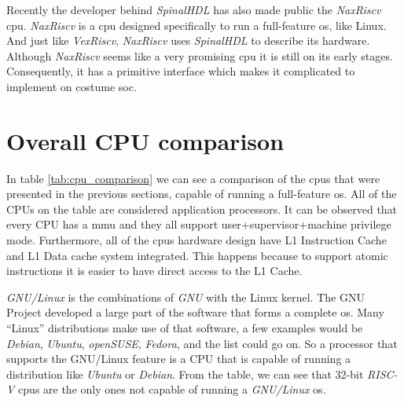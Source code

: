 Recently the developer behind \textit{SpinalHDL} has also made public the \textit{NaxRiscv} \acrshort{cpu}. \textit{NaxRiscv} is a \acrshort{cpu} designed specifically to run a full-feature \acrlong{os}, like Linux. And just like \textit{VexRiscv}, \textit{NaxRiscv} uses \textit{SpinalHDL} to describe its hardware. Although \textit{NaxRiscv} seems like a very promising \acrshort{cpu} it is still on its early stages. Consequently, it has a primitive interface which makes it complicated to implement on costume \acrfull{soc}.


\section{Overall CPU comparison}
\label{section:cpu_comparison}
In table \ref*{tab:cpu_comparison} we can see a comparison of the \acrshort{cpu}s that were presented in the previous sections, capable of running a full-feature \acrfull{os}. All of the CPUs on the table are considered application processors. It can be observed that every CPU has a \acrfull{mmu} and they all support \acrshort{user}+\acrshort{supervisor}+\acrshort{machine} privilege mode. Furthermore, all of the \acrshort{cpu}s hardware design have L1 Instruction Cache and L1 Data cache system integrated. This happens because to support atomic instructions it is easier to have direct access to the L1 Cache.

\textit{GNU/Linux} is the combinations of \textit{GNU} with the Linux kernel. The GNU Project developed a large part of the software that forms a complete \acrfull{os}. Many \enquote{Linux} distributions make use of that software, a few examples would be \textit{Debian}, \textit{Ubuntu}, \textit{openSUSE}, \textit{Fedora}, and the list could go on. So a processor that supports the GNU/Linux feature is a CPU that is capable of running a distribution like \textit{Ubuntu} or \textit{Debian}. From the table, we can see that 32-bit \textit{RISC-V} \acrshort{cpu}s are the only ones not capable of running a \textit{GNU/Linux} \acrfull{os}.

